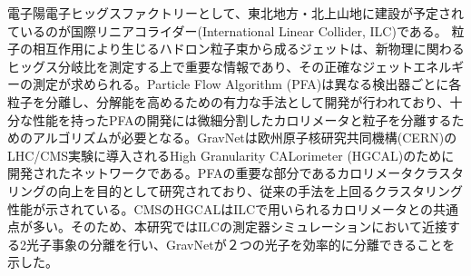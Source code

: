 電子陽電子ヒッグスファクトリーとして、東北地方・北上山地に建設が予定されているのが国際リニアコライダー(International Linear Collider, ILC)である。%
   粒子の相互作用により生じるハドロン粒子束から成るジェットは、新物理に関わるヒッグス分岐比を測定する上で重要な情報であり、その正確なジェットエネルギーの測定が求められる。Particle Flow Algorithm (PFA)は異なる検出器ごとに各粒子を分離し、分解能を高めるための有力な手法として開発が行われており、十分な性能を持ったPFAの開発には微細分割したカロリメータと粒子を分離するためのアルゴリズムが必要となる。GravNetは欧州原子核研究共同機構(CERN)のLHC/CMS実験に導入されるHigh Granularity CALorimeter (HGCAL)のために開発されたネットワークである。PFAの重要な部分であるカロリメータクラスタリングの向上を目的として研究されており、従来の手法を上回るクラスタリング性能が示されている。CMSのHGCALはILCで用いられるカロリメータとの共通点が多い。そのため、本研究ではILCの測定器シミュレーションにおいて近接する2光子事象の分離を行い、GravNetが２つの光子を効率的に分離できることを示した。
  
